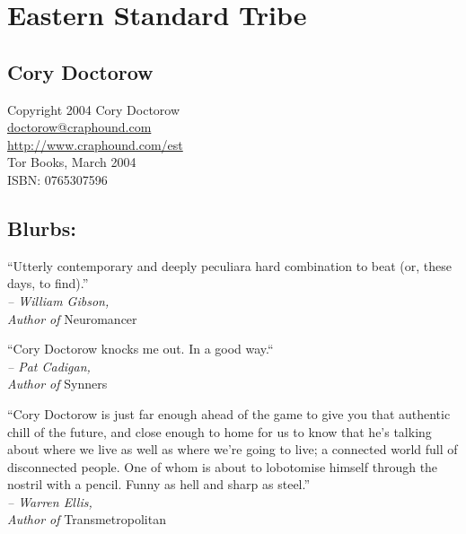 \section{Eastern Standard Tribe}

\subsection{Cory Doctorow}
\begin{flushleft}
Copyright 2004 Cory Doctorow\\
\href{mailto:doctorow@craphound.com}{doctorow@craphound.com}\\
\href{http://www.craphound.com/est}{http://www.craphound.com/est}\\
Tor Books, March 2004\\
ISBN: 0765307596\\
\end{flushleft}

\subsection{Blurbs:}
{
\setlength{\parindent}{0pt}

“Utterly contemporary and deeply peculiar{\dash}a hard combination to
beat (or, these days, to find).”
\\
\hspace*{\fill}\emph{-- William Gibson,\\\hspace*{\fill}Author of} Neuromancer

\bigskip

“Cory Doctorow knocks me out. In a good way.“
\\
\hspace*{\fill}\emph{-- Pat Cadigan,\\\hspace*{\fill} Author of} Synners

\bigskip

“Cory Doctorow is just far enough ahead of the game to give you
that authentic chill of the future, and close enough to home for us
to know that he’s talking about where we live as well as where
we’re going to live; a connected world full of disconnected people.
One of whom is about to lobotomise himself through the nostril with
a pencil. Funny as hell and sharp as
steel.”
\\
\hspace*{\fill}\emph{-- Warren Ellis,\\\hspace*{\fill}Author of} 
Transmetropolitan}


